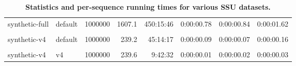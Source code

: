 \begin{table}[hb]
\begin{center}
\begin{tabular}{llrr|rrrr}
synthetic-full  & default  & 1000000 & 1607.1 & 450:15:46 &   0:00:00.78 &   0:00:00.84 &   0:00:01.62 \\
& & & & & & & \\
synthetic-v4    & default  & 1000000 &  239.2 &  45:14:17 &   0:00:00.09 &   0:00:00.07 &   0:00:00.16 \\
& & & & & & & \\
synthetic-v4    & v4       & 1000000 &  239.6 &   9:42:32 &   0:00:00.01 &   0:00:00.02 &   0:00:00.03 \\ 
\end{tabular}
\end{center}
\label{tbl:ptimes}
\caption{\textbf{Statistics and  per-sequence running times for various SSU datasets.}}
\end{table}
